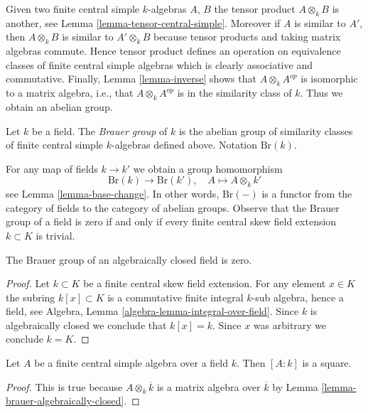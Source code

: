 \noindent
Given two finite central simple $k$-algebras $A$, $B$ the tensor
product $A \otimes_k B$ is another, see
Lemma \ref{lemma-tensor-central-simple}.
Moreover if $A$ is similar to $A'$, then $A \otimes_k B$ is similar
to $A' \otimes_k B$ because tensor products and taking matrix
algebras commute. Hence tensor product defines an operation on
equivalence classes of finite central simple algebras which is clearly
associative and commutative. Finally,
Lemma \ref{lemma-inverse}
shows that $A \otimes_k A^{op}$ is isomorphic to a matrix algebra, i.e.,
that $A \otimes_k A^{op}$ is in the similarity class of $k$.
Thus we obtain an abelian group.

\begin{definition}
\label{definition-brauer-group}
Let $k$ be a field. The {\it Brauer group} of $k$ is the abelian group
of similarity classes of finite central simple $k$-algebras defined
above. Notation $\text{Br}(k)$.
\end{definition}

\noindent
For any map of fields $k \to k'$ we obtain a group homomorphism
$$
\text{Br}(k) \longrightarrow \text{Br}(k'),\quad
A \longmapsto A \otimes_k k'
$$
see Lemma \ref{lemma-base-change}. In other words, $\text{Br}(-)$ is
a functor from the category of fields to the category of abelian groups.
Observe that the Brauer group
of a field is zero if and only if every finite central skew field
extension $k \subset K$ is trivial.

\begin{lemma}
\label{lemma-brauer-algebraically-closed}
The Brauer group of an algebraically closed field is zero.
\end{lemma}

\begin{proof}
Let $k \subset K$ be a finite central skew field extension.
For any element $x \in K$ the subring $k[x] \subset K$ is a
commutative finite integral $k$-sub algebra, hence a field, see
Algebra, Lemma \ref{algebra-lemma-integral-over-field}.
Since $k$ is algebraically closed we conclude that
$k[x] = k$. Since $x$ was arbitrary we conclude $k = K$.
\end{proof}

\begin{lemma}
\label{lemma-dimension-square}
Let $A$ be a finite central simple algebra over a field $k$.
Then $[A : k]$ is a square.
\end{lemma}

\begin{proof}
This is true because $A \otimes_k \overline{k}$ is a matrix
algebra over $\overline{k}$ by
Lemma \ref{lemma-brauer-algebraically-closed}.
\end{proof}




